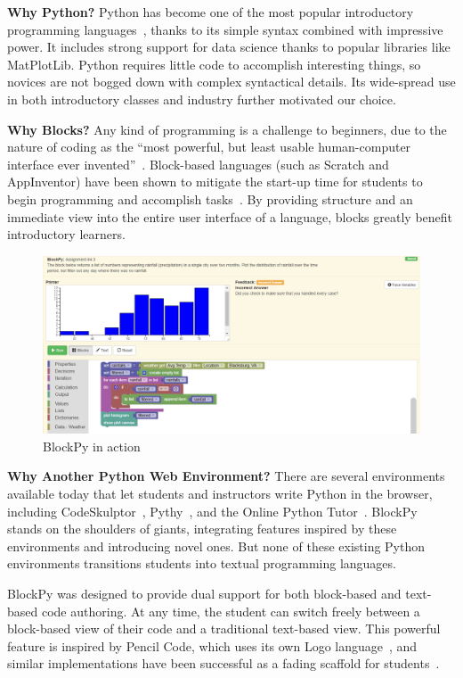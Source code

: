 \documentclass[10pt, conference, compsocconf]{IEEEtran}
\begin{document}
\textbf{Why Python?}
Python has become one of the most popular introductory programming languages~\cite{guo2014python}, thanks to its simple syntax combined with impressive power.
It includes strong support for data science thanks to popular libraries like MatPlotLib.
Python requires little code to accomplish interesting things, so novices are not bogged down with complex syntactical details.
Its wide-spread use in both introductory classes and industry further motivated our choice.

\textbf{Why Blocks?}
Any kind of programming is a challenge to beginners, due to the nature of coding as the ``most powerful, but least usable human-computer interface ever invented''~\cite{koh-ui-programming}.
Block-based languages (such as Scratch and AppInventor) have been shown to mitigate the start-up time for students to begin programming and accomplish tasks~\cite{bbl-Price,WeintropIcer}.
By providing structure and an immediate view into the entire user interface of a language, blocks greatly benefit introductory learners.

\begin{figure}[ht]
\includegraphics[width=\textwidth]{images/blockpy-interface-2}
\caption{BlockPy in action}
\label{fig-blockpy-full}
\end{figure}

\textbf{Why Another Python Web Environment?}
There are several environments available today that let students and instructors write Python in the browser, including CodeSkulptor~\cite{CodeSkulptor-Tang}, Pythy~\cite{pythy}, and the Online Python Tutor~\cite{Guo:2013}.
BlockPy stands on the shoulders of giants, integrating features inspired by these environments and introducing novel ones.
But none of these existing Python environments transitions students into textual programming languages.

BlockPy was designed to provide dual support for both block-based and text-based code authoring.
At any time, the student can switch freely between a block-based view of their code and a traditional text-based view.
This powerful feature is inspired by Pencil Code, which uses its own Logo language~\cite{Bau}, and similar implementations have been successful as a fading scaffold for students~\cite{Matsuzawa}.
\end{document}
